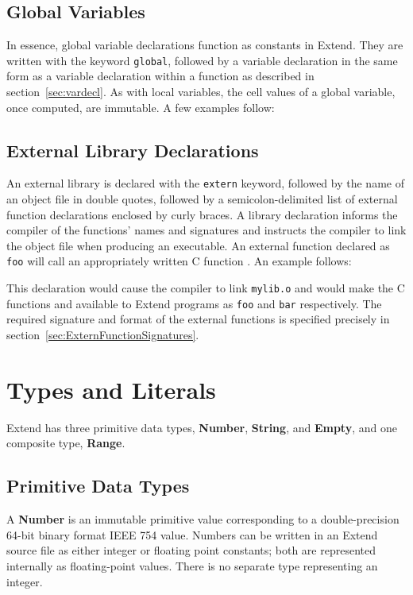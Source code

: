 	\subsection{Global Variables}
		In essence, global variable declarations function as constants in Extend. They are written with the keyword \texttt{global}, followed by a variable declaration in the same form as a variable declaration within a function as described in section~\ref{sec:vardecl}. As with local variables, the cell values of a global variable, once computed, are immutable. A few examples follow:
		
	\subsection{External Library Declarations}
	  An external library is declared with the \texttt{extern} keyword, followed by the name of an object file in double quotes, followed by a semicolon-delimited list of external function declarations enclosed by curly braces. A library declaration informs the compiler of the functions' names and signatures and instructs the compiler to link the
		object file when producing an executable. An external function declared as \texttt{foo} will call an appropriately written C function \texttt{}. An example follows:
		
		This declaration would cause the compiler to link \texttt{mylib.o} and would make the C functions \texttt{} and \texttt{} available to Extend programs as \texttt{foo} and \texttt{bar} respectively. The required signature and format of the external functions is specified precisely in section~\ref{sec:ExternFunctionSignatures}.
\section{Types and Literals}
		Extend has three primitive data types, \textbf{Number}, \textbf{String}, and \textbf{Empty}, and one composite type, \textbf{Range}.
	\subsection{Primitive Data Types}
		A \textbf{Number} is an immutable primitive value corresponding to a double-precision 64-bit binary format IEEE 754 value. Numbers can be written in an Extend source file as either integer or floating point constants; both are represented internally as floating-point values. There is no separate type representing an integer.

